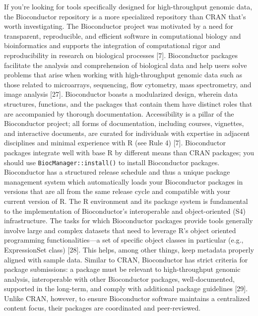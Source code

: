 \documentclass[10pt,letterpaper]{article}
\begin{document}
If you're looking for tools specifically designed for high-throughput
genomic data, the Bioconductor repository is a more specialized
repository than CRAN that's worth investigating. The Bioconductor
project was motivated by a need for transparent, reproducible, and
efficient software in computational biology and bioinformatics and
supports the integration of computational rigor and reproducibility in
research on biological processes {[}7{]}. Bioconductor packages
facilitate the analysis and comprehension of biological data and help
users solve problems that arise when working with high-throughput
genomic data such as those related to microarrays, sequencing, flow
cytometry, mass spectrometry, and image analysis {[}27{]}. Bioconductor
boasts a modularized design, wherein data structures, functions, and the
packages that contain them have distinct roles that are accompanied by
thorough documentation. Accessibility is a pillar of the Bioconductor
project; all forms of documentation, including courses, vignettes, and
interactive documents, are curated for individuals with expertise in
adjacent disciplines and minimal experience with R (see Rule 4) {[}7{]}.
Bioconductor packages integrate well with base R by different means than
CRAN packages; you should use \texttt{BiocManager::install()} to install
Bioconductor packages. Bioconductor has a structured release schedule
and thus a unique package management system which automatically loads
your Bioconductor packages in versions that are all from the same
release cycle and compatible with your current version of R. The R
environment and its package system is fundamental to the implementation
of Bioconductor's interoperable and object-oriented (S4) infrastructure.
The tasks for which Bioconductor packages provide tools generally
involve large and complex datasets that need to leverage R's object
oriented programming functionalities---a set of specific object classes
in particular (e.g., ExpressionSet class) {[}28{]}. This helps, among
other things, keep metadata properly aligned with sample data. Similar
to CRAN, Bioconductor has strict criteria for package submissions: a
package must be relevant to high-throughput genomic analysis,
interoperable with other Bioconductor packages, well-documented,
supported in the long-term, and comply with additional package
guidelines {[}29{]}. Unlike CRAN, however, to ensure Bioconductor
software maintains a centralized content focus, their packages are
coordinated and peer-reviewed.
\end{document}
